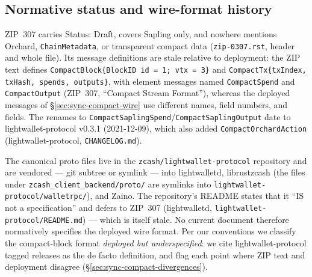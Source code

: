 \documentclass[11pt,a4paper]{article}
\theoremstyle{definition}
\begin{document}
\subsection{Normative status and wire-format history}%
\label{sec:sync-compact-status}

ZIP~307 carries Status: Draft, covers Sapling only, and nowhere mentions
Orchard, \texttt{ChainMetadata}, or transparent compact data
(\texttt{zip-0307.rst}, header and whole file). Its message definitions are
stale relative to deployment: the ZIP text defines
\texttt{CompactBlock\{BlockID id = 1; vtx = 3\}} and
\texttt{CompactTx\{txIndex, txHash, spends, outputs\}}, with element messages
named \texttt{CompactSpend} and \texttt{CompactOutput} (ZIP~307, ``Compact
Stream Format''), whereas the deployed messages of
\S\ref{sec:sync-compact-wire} use different names, field numbers, and fields.
The renames to \texttt{CompactSaplingSpend}/\texttt{CompactSaplingOutput}
date to \textsf{lightwallet-protocol} v0.3.1 (2021-12-09), which also added
\texttt{CompactOrchardAction} (\textsf{lightwallet-protocol},
\texttt{CHANGELOG.md}).

The canonical proto files live in the \texttt{zcash/lightwallet-protocol}
repository and are vendored --- git subtree or symlink --- into
\textsf{lightwalletd}, \textsf{librustzcash} (the files under
\texttt{zcash\_client\_backend/proto/} are symlinks into
\texttt{lightwallet-protocol/walletrpc/}), and \textsf{Zaino}. The
repository's README states that it ``IS not a specification'' and defers to
ZIP~307 (\textsf{lightwalletd},
\texttt{lightwallet-protocol/README.md}) --- which is itself stale. No
current document therefore normatively specifies the deployed wire format.
Per our conventions we classify the compact-block format \emph{deployed but
underspecified}: we cite \textsf{lightwallet-protocol} tagged releases as the
de facto definition, and flag each point where ZIP text and deployment
disagree (\S\ref{sec:sync-compact-divergences}).
\end{document}
